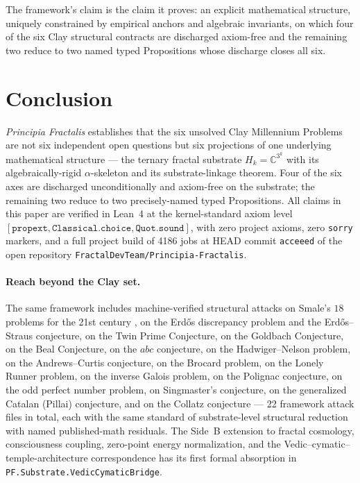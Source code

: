 \documentclass[11pt,a4paper]{article}
\theoremstyle{definition}
\begin{document}
The framework's claim is the claim it proves: an explicit
mathematical structure, uniquely constrained by empirical anchors
and algebraic invariants, on which four of the six Clay structural
contracts are discharged axiom-free and the remaining two reduce
to two named typed Propositions whose discharge closes all six.

\section{Conclusion}
\label{sec:conclusion}

\emph{Principia Fractalis} establishes that the six unsolved Clay
Millennium Problems are not six independent open questions but six
projections of one underlying mathematical structure --- the ternary
fractal substrate $H_k = \mathbb{C}^{3^k}$ with its
algebraically-rigid $\alpha$-skeleton and its substrate-linkage
theorem. Four of the six axes are discharged unconditionally and
axiom-free on the substrate; the remaining two reduce to two
precisely-named typed Propositions. All claims in this paper are
verified in Lean~4 at the kernel-standard axiom level
$[\texttt{propext}, \texttt{Classical.choice}, \texttt{Quot.sound}]$,
with zero project axioms, zero \texttt{sorry} markers, and a full
project build of 4186 jobs at HEAD commit \texttt{acceeed} of the
open repository \texttt{FractalDevTeam/Principia-Fractalis}.

\paragraph{Reach beyond the Clay set.} The same framework includes
machine-verified structural attacks on Smale's $18$ problems for the
21st century \cite{smale1998mathintelligencer,smale2000frontiers},
on the Erd\H{o}s discrepancy problem and the Erd\H{o}s--Straus
conjecture, on the Twin Prime Conjecture, on the Goldbach
Conjecture, on the Beal Conjecture, on the $abc$ conjecture, on the
Hadwiger--Nelson problem, on the Andrews--Curtis conjecture, on the
Brocard problem, on the Lonely Runner problem, on the inverse
Galois problem, on the Polignac conjecture, on the odd perfect
number problem, on Singmaster's conjecture, on the generalized
Catalan (Pillai) conjecture, and on the Collatz conjecture --- 22
framework attack files in total, each with the same standard of
substrate-level structural reduction with named published-math
residuals. The Side~B extension to fractal cosmology, consciousness
coupling, zero-point energy normalization, and the
Vedic--cymatic--temple-architecture correspondence has its first
formal absorption in \texttt{PF.Substrate.VedicCymaticBridge}.
\end{document}
